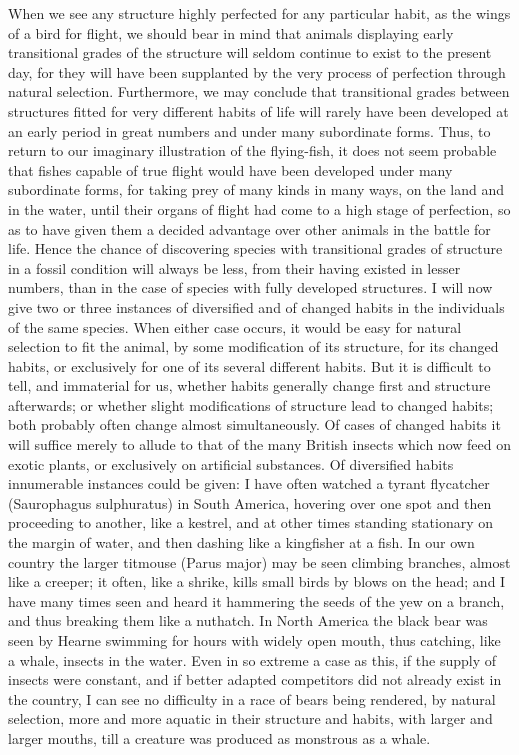 When we see any structure highly perfected for any particular habit, as the wings of a bird for flight, we should bear in mind that animals displaying early transitional grades of the structure will seldom continue to exist to the present day, for they will have been supplanted by the very process of perfection through natural selection. Furthermore, we may conclude that transitional grades between structures fitted for very different habits of life will rarely have been developed at an early period in great numbers and under many subordinate forms. Thus, to return to our imaginary illustration of the flying-fish, it does not seem probable that fishes capable of true flight would have been developed under many subordinate forms, for taking prey of many kinds in many ways, on the land and in the water, until their organs of flight had come to a high stage of perfection, so as to have given them a decided advantage over other animals in the battle for life. Hence the chance of discovering species with transitional grades of structure in a fossil condition will always be less, from their having existed in lesser numbers, than in the case of species with fully developed structures.
I will now give two or three instances of diversified and of changed habits in the individuals of the same species. When either case occurs, it would be easy for natural selection to fit the animal, by some modification of its structure, for its changed habits, or exclusively for one of its several different habits. But it is difficult to tell, and immaterial for us, whether habits generally change first and structure afterwards; or whether slight modifications of structure lead to changed habits; both probably often change almost simultaneously. Of cases of changed habits it will suffice merely to allude to that of the many British insects which now feed on exotic plants, or exclusively on artificial substances. Of diversified habits innumerable instances could be given: I have often watched a tyrant flycatcher (Saurophagus sulphuratus) in South America, hovering over one spot and then proceeding to another, like a kestrel, and at other times standing stationary on the margin of water, and then dashing like a kingfisher at a fish. In our own country the larger titmouse (Parus major) may be seen climbing branches, almost like a creeper; it often, like a shrike, kills small birds by blows on the head; and I have many times seen and heard it hammering the seeds of the yew on a branch, and thus breaking them like a nuthatch. In North America the black bear was seen by Hearne swimming for hours with widely open mouth, thus catching, like a whale, insects in the water. Even in so extreme a case as this, if the supply of insects were constant, and if better adapted competitors did not already exist in the country, I can see no difficulty in a race of bears being rendered, by natural selection, more and more aquatic in their structure and habits, with larger and larger mouths, till a creature was produced as monstrous as a whale.
